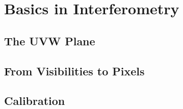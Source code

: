 \section{Basics in Interferometry} \label{radio}

\subsection{The UVW Plane}

\subsection{From Visibilities to Pixels}

\subsection{Calibration}